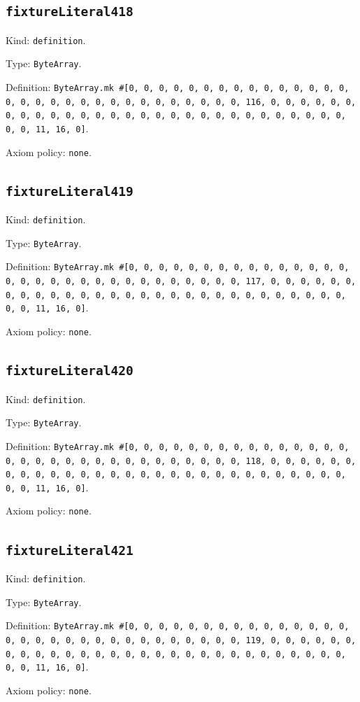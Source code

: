 \documentclass[11pt]{article}
\begin{document}
\subsection*{\texttt{fixtureLiteral418}}
\noindent Kind: \texttt{definition}.\par
\noindent Type: \texttt{ByteArray}.\par
\noindent Definition: \texttt{ByteArray.mk \#[0, 0, 0, 0, 0, 0, 0, 0, 0, 0, 0, 0, 0, 0, 0, 0, 0, 0, 0, 0, 0, 0, 0, 0, 0, 0, 0, 0, 0, 0, 0, 116, 0, 0, 0, 0, 0, 0, 0, 0, 0, 0, 0, 0, 0, 0, 0, 0, 0, 0, 0, 0, 0, 0, 0, 0, 0, 0, 0, 0, 0, 0, 0, 11, 16, 0]}.\par
\noindent Axiom policy: \texttt{none}.\par
\subsection*{\texttt{fixtureLiteral419}}
\noindent Kind: \texttt{definition}.\par
\noindent Type: \texttt{ByteArray}.\par
\noindent Definition: \texttt{ByteArray.mk \#[0, 0, 0, 0, 0, 0, 0, 0, 0, 0, 0, 0, 0, 0, 0, 0, 0, 0, 0, 0, 0, 0, 0, 0, 0, 0, 0, 0, 0, 0, 0, 117, 0, 0, 0, 0, 0, 0, 0, 0, 0, 0, 0, 0, 0, 0, 0, 0, 0, 0, 0, 0, 0, 0, 0, 0, 0, 0, 0, 0, 0, 0, 0, 11, 16, 0]}.\par
\noindent Axiom policy: \texttt{none}.\par
\subsection*{\texttt{fixtureLiteral420}}
\noindent Kind: \texttt{definition}.\par
\noindent Type: \texttt{ByteArray}.\par
\noindent Definition: \texttt{ByteArray.mk \#[0, 0, 0, 0, 0, 0, 0, 0, 0, 0, 0, 0, 0, 0, 0, 0, 0, 0, 0, 0, 0, 0, 0, 0, 0, 0, 0, 0, 0, 0, 0, 118, 0, 0, 0, 0, 0, 0, 0, 0, 0, 0, 0, 0, 0, 0, 0, 0, 0, 0, 0, 0, 0, 0, 0, 0, 0, 0, 0, 0, 0, 0, 0, 11, 16, 0]}.\par
\noindent Axiom policy: \texttt{none}.\par
\subsection*{\texttt{fixtureLiteral421}}
\noindent Kind: \texttt{definition}.\par
\noindent Type: \texttt{ByteArray}.\par
\noindent Definition: \texttt{ByteArray.mk \#[0, 0, 0, 0, 0, 0, 0, 0, 0, 0, 0, 0, 0, 0, 0, 0, 0, 0, 0, 0, 0, 0, 0, 0, 0, 0, 0, 0, 0, 0, 0, 119, 0, 0, 0, 0, 0, 0, 0, 0, 0, 0, 0, 0, 0, 0, 0, 0, 0, 0, 0, 0, 0, 0, 0, 0, 0, 0, 0, 0, 0, 0, 0, 11, 16, 0]}.\par
\noindent Axiom policy: \texttt{none}.\par
\end{document}
